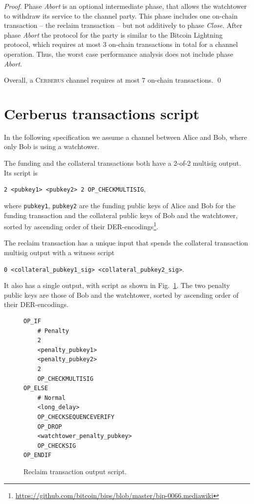 \documentclass[runningheads]{llncs}
\newcommand{\sys}{\textsc{Cerberus}\xspace}
\begin{document}
\begin{proof}
Phase \textit{Abort} is an optional intermediate phase, that allows the watchtower to withdraw its service to the channel party. This phase includes one on-chain transaction -- the reclaim transaction -- but not additively to phase \textit{Close}. After phase \textit{Abort} the protocol for the party is similar to the Bitcoin Lightning protocol, which  requires at most $3$ on-chain transactions in total for a channel operation. Thus, the worst case performance analysis does not include phase \textit{Abort}.

Overall, a \sys channel requires at most $7$ on-chain transactions.
\hfill \qed
\end{proof}


\section{Cerberus transactions script}
\label{sec:script}

In the following specification we assume a channel between Alice and Bob, where only Bob is using a watchtower.

The funding and the collateral transactions both have a 2-of-2 multisig output. Its script is

\texttt{2 <pubkey1> <pubkey2> 2 OP\_CHECKMULTISIG},

where \texttt{pubkey1}, \texttt{pubkey2} are the funding public keys of Alice and Bob for the funding transaction and the collateral public keys of Bob and the watchtower, sorted by ascending order of their DER-encodings\footnote{\url{https://github.com/bitcoin/bips/blob/master/bip-0066.mediawiki}}.

The reclaim transaction has a unique input that spends the collateral transaction multisig output with a witness script

\texttt{0 <collateral\_pubkey1\_sig> <collateral\_pubkey2\_sig>}.

It also has a single output, with script as shown in Fig.~\ref{script:claim}. The two penalty public keys are those of Bob and the watchtower, sorted by ascending order of their DER-encodings.

\begin{figure}[ht!]
    \begin{verbatim}
OP_IF
    # Penalty
    2
    <penalty_pubkey1>
    <penalty_pubkey2>
    2
    OP_CHECKMULTISIG
OP_ELSE
    # Normal
    <long_delay>
    OP_CHECKSEQUENCEVERIFY
    OP_DROP
    <watchtower_penalty_pubkey>
    OP_CHECKSIG
OP_ENDIF
    \end{verbatim}
\caption{Reclaim transaction output script.}
\label{script:claim}
\end{figure}
\end{document}
